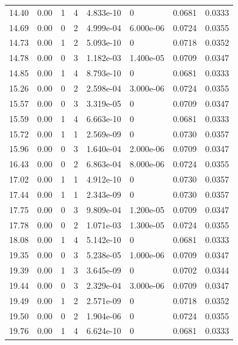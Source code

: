 \documentclass[preview]{standalone}
\begin{document}
{{{\begin{tabular}{L{1.2cm}C{1.2cm} C{0.3cm}C{0.5cm} C{1.4cm}C{1.4cm} C{1.4cm}C{1.4cm}}
  14.40  &  0.00  & 1     &  4 &  4.833e-10  & 0  & 0.0681 &  0.0333   \\ 
  14.69  &  0.00  & 0     &  2 &  4.999e-04  & 6.000e-06  & 0.0724 &  0.0355   \\ 
  14.73  &  0.00  & 1     &  2 &  5.093e-10  & 0  & 0.0718 &  0.0352   \\ 
  14.78  &  0.00  & 0     &  3 &  1.182e-03  & 1.400e-05  & 0.0709 &  0.0347   \\ 
  14.85  &  0.00  & 1     &  4 &  8.793e-10  & 0  & 0.0681 &  0.0333   \\ 
  15.26  &  0.00  & 0     &  2 &  2.598e-04  & 3.000e-06  & 0.0724 &  0.0355   \\ 
  15.57  &  0.00  & 0     &  3 &  3.319e-05  & 0  & 0.0709 &  0.0347   \\ 
  15.59  &  0.00  & 1     &  4 &  6.663e-10  & 0  & 0.0681 &  0.0333   \\ 
  15.72  &  0.00  & 1     &  1 &  2.569e-09  & 0  & 0.0730 &  0.0357   \\ 
  15.96  &  0.00  & 0     &  3 &  1.640e-04  & 2.000e-06  & 0.0709 &  0.0347   \\ 
  16.43  &  0.00  & 0     &  2 &  6.863e-04  & 8.000e-06  & 0.0724 &  0.0355   \\ 
  17.02  &  0.00  & 1     &  1 &  4.912e-10  & 0  & 0.0730 &  0.0357   \\ 
  17.44  &  0.00  & 1     &  1 &  2.343e-09  & 0  & 0.0730 &  0.0357   \\ 
  17.75  &  0.00  & 0     &  3 &  9.809e-04  & 1.200e-05  & 0.0709 &  0.0347   \\ 
  17.78  &  0.00  & 0     &  2 &  1.071e-03  & 1.300e-05  & 0.0724 &  0.0355   \\ 
  18.08  &  0.00  & 1     &  4 &  5.142e-10  & 0  & 0.0681 &  0.0333   \\ 
  19.35  &  0.00  & 0     &  3 &  5.238e-05  & 1.000e-06  & 0.0709 &  0.0347   \\ 
  19.39  &  0.00  & 1     &  3 &  3.645e-09  & 0  & 0.0702 &  0.0344   \\ 
  19.44  &  0.00  & 0     &  3 &  2.329e-04  & 3.000e-06  & 0.0709 &  0.0347   \\ 
  19.49  &  0.00  & 1     &  2 &  2.571e-09  & 0  & 0.0718 &  0.0352   \\ 
  19.50  &  0.00  & 0     &  2 &  1.904e-06  & 0  & 0.0724 &  0.0355   \\ 
  19.76  &  0.00  & 1     &  4 &  6.624e-10  & 0  & 0.0681 &  0.0333   \\ 

\end{tabular}}}}
\end{document}
